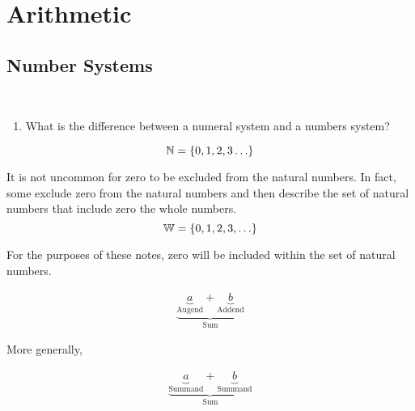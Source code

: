 \documentclass[20150903-160354-rs2.2-MarksMathNotebook.tex]{subfiles}
\begin{document}
%
%


\chapter{Arithmetic}



\section{Number Systems}

\begin{essentialq}\hfill \\

\begin{enumerate}
	\item What is the difference between a numeral system and a numbers system?
\end{enumerate}

\end{essentialq}

\begin{definition}

\[
\mathbb{N}=\left\{0, 1, 2, 3 \ldots\right\}
\]

\end{definition}

\begin{remark}
It is not uncommon for zero to be excluded from the natural numbers.  In fact, some exclude zero from the natural numbers and then describe the set of natural numbers that include zero the whole numbers. \\

\[
\mathbb{W}=\left\{0, 1, 2, 3, \ldots\right\}
\]

For the purposes of these notes, zero will be included within the set of natural numbers.
\end{remark}

\begin{definition}
\begin{align}
\underbrace{\underbrace{a}_{\text{Augend}}+\underbrace{b}_{\text{Addend}}}_{\text{Sum}} \label{eq:ooa}
\end{align}

More generally,


\begin{align}
\underbrace{\underbrace{a}_{\text{Summand}}+\underbrace{b}_{\text{Summand}}}_{\text{Sum}} \label{eq:ooag}
\end{align}
\end{definition}
\end{document}
